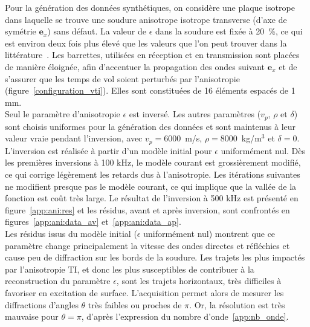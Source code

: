 Pour la génération des données synthétiques, on considère une plaque isotrope dans laquelle se trouve une soudure anisotrope isotrope transverse (d'axe de symétrie $\bm{e}_{x}$) sans défaut. La valeur de $\epsilon$ dans la soudure est fixée à 20~\%, ce qui est environ deux fois plus élevé que les valeurs que l'on peut trouver dans la littérature~\citep{chassignole}. 
Les barrettes, utilisées en réception et en transmission  sont placées de manière éloignée, afin d'accentuer la propagation des ondes suivant $\bm{e}_{x}$ et de s'assurer que les temps de vol soient perturbés par l'anisotropie (figure~\ref{configuration_vti}). Elles sont constituées de 16 éléments espacés de 1 mm.\\
Seul le paramètre d'anisotropie $\epsilon$ est inversé. Les autres paramètres ($v_{p}$, $\rho$ et $\delta$) sont choisis uniformes pour la génération des données et sont maintenus à leur valeur vraie pendant l'inversion, avec $v_{p}=6000$~m/s, $\rho=8000$~kg/m$^3$ et $\delta=0$.\\


L'inversion est réalisée à partir d'un modèle initial pour $\epsilon$ uniformément nul. Dès les premières inversions à 100 kHz, le modèle courant est grossièrement modifié, ce qui corrige légèrement les retards dus à l'anisotropie. Les itérations suivantes ne modifient presque pas le modèle courant, ce qui implique que la vallée de la fonction est coût très large. Le résultat de l'inversion à 500 kHz est présenté en figure~\ref{app:ani:res} et les résidus, avant et après inversion, sont confrontés en figures~\ref{app:ani:data_av} et~\ref{app:ani:data_ap}. \\


Les résidus issus du modèle initial ($\epsilon$ uniformément nul) montrent que ce paramètre change principalement la vitesse des ondes directes et réfléchies et cause peu de diffraction sur les bords de la soudure. Les trajets les plus impactés par l'anisotropie TI, et donc les plus susceptibles de contribuer à la reconstruction du paramètre $\epsilon$, sont les trajets horizontaux, très difficiles à favoriser en excitation de surface. L'acquisition permet alors de mesurer les diffractions d'angles $\theta$ très faibles ou proches de $\pi$. Or, la résolution est très mauvaise pour $\theta=\pi$, d'après l'expression du nombre d'onde~\ref{app:nb_onde}.  

